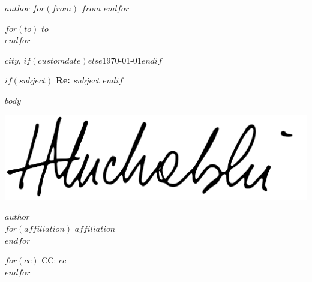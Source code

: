 \documentclass[$fontsize$, letterpaper]{article}
\begin{document}
\small
\textsc{\textbf{$author$}} 
$for(from)$
\textbullet{} \textsc{$from$} 
$endfor$

\vspace{3em}

\normalsize \rmfamily
$for(to)$
$to$\\
$endfor$
\vspace{1em}


\rmfamily
\begin{flushright}
  $city$, $if(customdate)$$else$\today$endif$
\end{flushright}

$if(subject)$
\textbf{Re: $subject$}
$endif$

\vspace{2em}

$body$
\ClearWallPaper %
\begin{FlushLeft}
  {
    \includegraphics[height=2\baselineskip]{signature.pdf} \par
  }
  {
    \vspace{2.5\baselineskip}
  }
  $author$\\
  $for(affiliation)$
  $affiliation$\\
  $endfor$
\end{FlushLeft}

\vspace{1em}
$for(cc)$
  CC: $cc$\\
$endfor$
\end{document}
